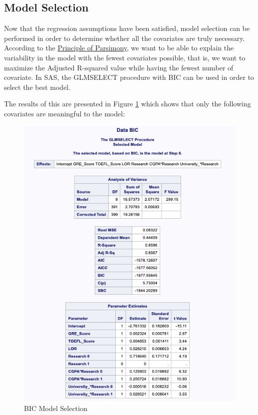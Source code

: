 \documentclass{article}
\begin{document}
\subsection*{Model Selection}

Now that the regression assumptions have been satisfied, model selection can be performed in order to determine whether all the covariates are truly necessary. According to the \href{https://www.oxfordreference.com/view/10.1093/oi/authority.20110803100346221}{Principle of Parsimony}, we want to be able to explain the variability in the model with the fewest covariates possible, that is, we want to maximize the Adjusted R-squared value while having the fewest number of covariate. In SAS, the GLMSELECT procedure with BIC can be used in order to select the best model. 

The results of this are presented in Figure \ref{fig:bic} which shows that only the following covariates are meaningful to the model:

\begin{figure}
\centering
\includegraphics[scale=0.6]{bic.png}
\caption{BIC Model Selection}
\label{fig:bic}
\end{figure}
\end{document}
